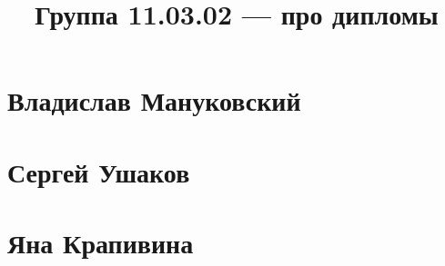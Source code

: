 \documentclass{article}
\title{Группа 11.03.02 --- про дипломы}
\begin{document}
\section*{Владислав Мануковский}

\section{Сергей Ушаков}

\section{Яна Крапивина}
\end{document}
